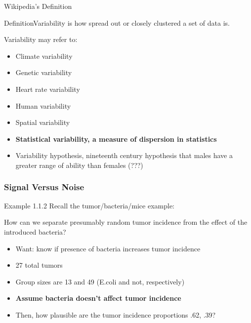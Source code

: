 \documentclass{beamer}
\begin{document}
\begin{frame}{Wikipedia's Definition}
\begin{block}{Definition}Variability is how spread out or closely clustered a set of data is.\end{block}

Variability may refer to:
\begin{itemize}
  \item  Climate variability
  \item  Genetic variability
  \item  Heart rate variability
  \item  Human variability
  \item  Spatial variability
  \item  \textbf{Statistical variability, a measure of dispersion in statistics}
  \item  Variability hypothesis, nineteenth century hypothesis that males have a greater range of ability than females (???)
\end{itemize}
\end{frame}

\subsubsection{Signal Versus Noise}

\begin{frame}{Example 1.1.2}
Recall the tumor/bacteria/mice example:

How can we separate presumably random tumor incidence from the effect of the introduced bacteria?
\end{frame}

\begin{frame}
\begin{itemize}
  \item Want: know if presence of bacteria increases tumor incidence
  \item 27 total tumors
  \item Group sizes are 13 and 49 (E.coli and not, respectively)
  \item \textbf{Assume bacteria doesn't affect tumor incidence}
  \item Then, how plausible are the tumor incidence proportions .62, .39?
\end{itemize}
\end{frame}
\end{document}
